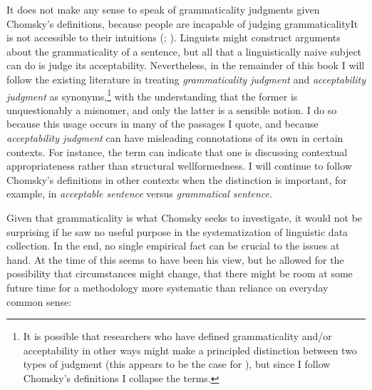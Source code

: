 It does not make any sense to speak of grammaticality judgments given Chomsky's definitions, because people are incapable of judging grammaticality\schdash{}It is not accessible to their intuitions (\citet[51]{Newmeyer1983}; \citet{Gombert1992}). Linguists might construct arguments about the grammaticality of a sentence, but all that a linguistically naive subject can do is judge its acceptability. Nevertheless, in the remainder of this book I will follow the existing literature in treating \textit{grammaticality judgment} and \textit{acceptability judgment} as synonyms,\footnote{It is possible that researchers who have defined grammaticality and/or acceptability in other ways might make a principled distinction between two types of judgment (this appears to be the case for \citet{Langendoen1973}), but since I follow Chomsky's definitions I collapse the terms.}
 with the understanding that the former is unquestionably a misnomer, and only the latter is a
sensible notion. I do so because this usage occurs in many of the passages I quote, and because \textit{acceptability judgment} can have misleading connotations of its own in certain contexts. For instance, the term can indicate that one is discussing contextual appropriateness rather than structural wellformedness. I will continue to follow Chomsky's definitions in other contexts when the distinction is important, for example, in \textit{acceptable sentence} versus \textit{grammatical sentence}.

Given that grammaticality is what Chomsky seeks to investigate, it would not be surprising if he saw no useful purpose in the systematization of linguistic data collection. In the end, no single empirical fact can be crucial to the issues at hand. At the time of \aspectsq this seems to have been his view, but he allowed for the possibility that circumstances might change, that there might be room at some future time for a methodology more systematic than reliance on everyday common sense:

